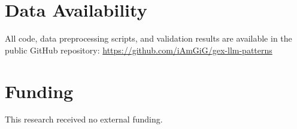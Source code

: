 \documentclass[preprint,12pt,authoryear]{elsarticle}
\begin{document}
\section*{Data Availability}
All code, data preprocessing scripts, and validation results are available in the public GitHub repository: \url{https://github.com/iAmGiG/gex-llm-patterns}

\section*{Funding}
This research received no external funding.


\FloatBarrier


\end{document}
